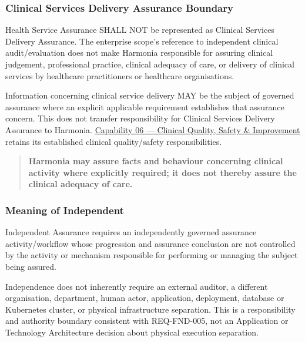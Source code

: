 \subsubsection*{Clinical Services Delivery Assurance Boundary}
\label{rad:business:1104}

Health Service Assurance SHALL NOT be represented as Clinical Services Delivery Assurance. The enterprise scope's reference to independent clinical audit/\allowbreak{}evaluation does not make Harmonia responsible for assuring clinical judgement, professional practice, clinical adequacy of care, or delivery of clinical services by healthcare practitioners or healthcare organisations.

\label{rad:business:1106}

Information concerning clinical service delivery MAY be the subject of governed assurance where an explicit applicable requirement establishes that assurance concern. This does not transfer responsibility for Clinical Services Delivery Assurance to Harmonia. \hyperref[rad:business:522]{Capability 06 — Clinical Quality, Safety \& Improvement} retains its established clinical quality/\allowbreak{}safety responsibilities.

\label{rad:business:1108}

\begin{quote}

\textbf{Harmonia may assure facts and behaviour concerning clinical activity where explicitly required; it does not thereby assure the clinical adequacy of care.}


\end{quote}
\label{rad:business:1110}
\subsubsection*{Meaning of Independent}
\label{rad:business:1112}

Independent Assurance requires an independently governed assurance activity/\allowbreak{}workflow whose progression and assurance conclusion are not controlled by the activity or mechanism responsible for performing or managing the subject being assured.

\label{rad:business:1114}

Independence does not inherently require an external auditor, a different organisation, department, human actor, application, deployment, database or Kubernetes cluster, or physical infrastructure separation. This is a responsibility and authority boundary consistent with REQ-FND-005, not an Application or Technology Architecture decision about physical execution separation.

